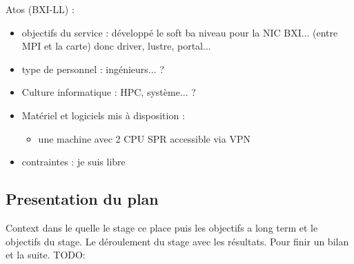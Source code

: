 Atos (BXI-LL) :
\begin{itemize}
  \item objectifs du service : développé le soft ba niveau pour la NIC BXI... (entre MPI et la carte) donc driver, lustre, portal...
  \item type de personnel : ingénieurs... ?
  \item Culture informatique : HPC, système... ?
  \item Matériel et logiciels mis à disposition :
  \begin{itemize}
    \item une machine avec 2 CPU SPR accessible via VPN
  \end{itemize}
  \item contraintes : je suis libre
\end{itemize}

\subsection{Presentation du plan}

Context dans le quelle le stage ce place puis les objectifs a long term et le objectifs du stage.
Le déroulement du stage avec les résultats. Pour finir un bilan et la suite.
TODO: 
